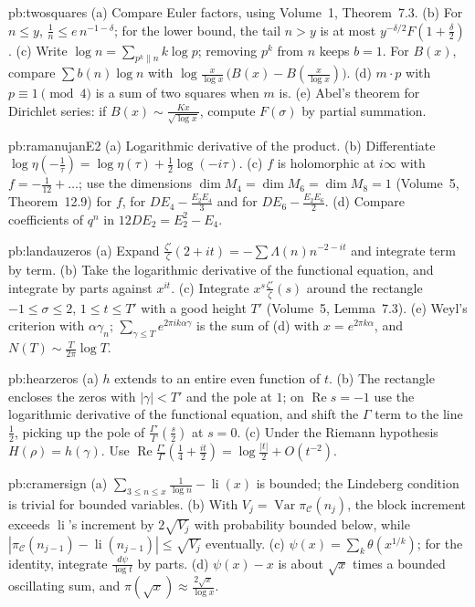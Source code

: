\begin{hint}{pb:twosquares}
(a) Compare Euler factors, using Volume~1, Theorem~7.3. (b) For $n\le y$, $\frac1n\le e\,n^{-1-\delta}$; for the lower bound, the tail $n>y$ is at most
$y^{-\delta/2}F(1+\frac\delta2)$. (c) Write $\log n=\sum_{p^k\parallel n}k\log p$; removing $p^k$ from $n$ keeps $b=1$. For $B(x)$, compare $\sum b(n)\log n$ with
$\log\frac x{\log x}\,\bigl(B(x)-B(\frac x{\log x})\bigr)$. (d) $m\cdot p$ with $p\equiv1\pmod4$ is a sum of two squares when $m$ is. (e) Abel's theorem for Dirichlet series: if $B(x)\sim\frac{Kx}{\sqrt{\log x}}$,
compute $F(\sigma)$ by partial summation.
\end{hint}

\begin{hint}{pb:ramanujanE2}
(a) Logarithmic derivative of the product. (b) Differentiate $\log\eta(-\frac1\tau)=\log\eta(\tau)+\frac12\log(-i\tau)$. (c) $f$ is holomorphic at $i\infty$ with $f=-\frac1{12}+\dots$;
use the dimensions $\dim M_4=\dim M_6=\dim M_8=1$ (Volume~5, Theorem~12.9) for $f$, for $DE_4-\frac{E_2E_4}3$ and for $DE_6-\frac{E_2E_6}2$. (d) Compare coefficients of $q^n$ in
$12DE_2=E_2^2-E_4$.
\end{hint}

\begin{hint}{pb:landauzeros}
(a) Expand $\frac{\zeta'}\zeta(2+it)=-\sum\Lambda(n)n^{-2-it}$ and integrate term by term. (b) Take the logarithmic derivative of the functional equation, and integrate by
parts against $x^{it}$. (c) Integrate $x^s\frac{\zeta'}\zeta(s)$ around the rectangle $-1\le\sigma\le2$, $1\le t\le T'$ with a good height $T'$ (Volume~5, Lemma~7.3). (e) Weyl's criterion
with $\alpha\gamma_n$; $\sum_{\gamma\le T}e^{2\pi ik\alpha\gamma}$ is the sum of (d) with $x=e^{2\pi k\alpha}$, and $N(T)\sim\frac T{2\pi}\log T$.
\end{hint}

\begin{hint}{pb:hearzeros}
(a) $h$ extends to an entire even function of $t$. (b) The rectangle encloses the zeros with $|\gamma|<T'$ and the pole at $1$; on $\operatorname{Re}s=-1$ use the
logarithmic derivative of the functional equation, and shift the $\Gamma$ term to the line $\frac12$, picking up the pole of $\frac{\Gamma'}\Gamma(\frac s2)$ at $s=0$. (c) Under the
Riemann hypothesis $H(\rho)=h(\gamma)$. Use $\operatorname{Re}\frac{\Gamma'}\Gamma(\frac14+\frac{it}2)=\log\frac{|t|}2+O(t^{-2})$.
\end{hint}

\begin{hint}{pb:cramersign}
(a) $\sum_{3\le n\le x}\frac1{\log n}-\operatorname{li}(x)$ is bounded; the Lindeberg condition is trivial for bounded variables. (b) With $V_j=\operatorname{Var}\pi_{\mathcal C}(n_j)$, the
block increment exceeds $\operatorname{li}$'s increment by $2\sqrt{V_j}$ with probability bounded below, while $|\pi_{\mathcal C}(n_{j-1})-\operatorname{li}(n_{j-1})|\le\sqrt{V_j}$
eventually. (c) $\psi(x)=\sum_k\theta(x^{1/k})$; for the identity, integrate $\frac{d\psi}{\log t}$ by parts. (d) $\psi(x)-x$ is about $\sqrt x$ times a bounded
oscillating sum, and $\pi(\sqrt x)\approx\frac{2\sqrt x}{\log x}$.
\end{hint}

